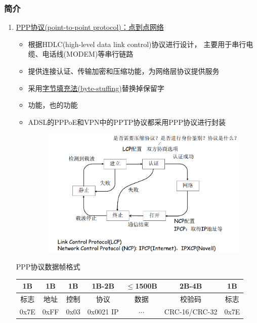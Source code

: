 \subsubsection{简介}
\begin{enumerate}
\item \underline{PPP协议(point-to-point protocol)：点到点网络}
\begin{itemize}
	\item 根据HDLC(high-level data link control)协议进行设计，
	主要用于串行电缆、电话线(MODEM)等串行链路
	\item 提供连接认证、传输加密和压缩功能，为网络层协议提供服务
	\item 采用\underline{字节填充法(byte-stuffing)}替换掉保留字
	\item {}功能，也的功能
	\item ADSL的PPPoE和VPN中的PPTP协议都采用PPP协议进行封装
	\begin{figure}[H]
		\centering
		\includegraphics[width=0.6\linewidth]{fig/PPP.PNG}
	\end{figure}
\end{itemize}
\begin{center}
PPP协议数据帧格式\\
\begin{tabular}{|c|c|c|c|c|c|c|}\hline
1B & 1B & 1B & 1B-2B & $\leq$1500B & 2B-4B & 1B\\\hline
标志 & 地址 & 控制 & 协议 & 数据 & 校验码 & 标志\\\hline
0x7E & 0xFF & 0x03 & 0x0021 IP & $\cdots$ & CRC-16/CRC-32 & 0x7E\\\hline
\end{tabular}
\end{center}


\end{enumerate}
